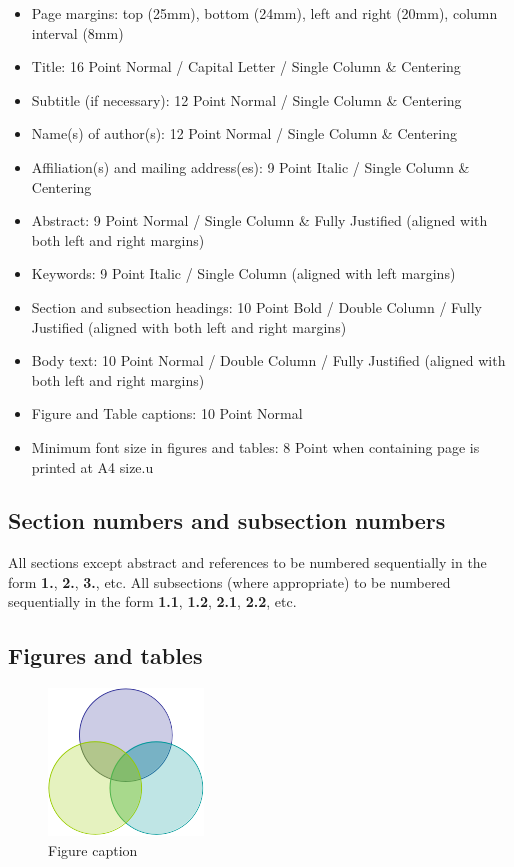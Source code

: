 \documentclass[a4paper,10pt,conference,compsoc]{ISASE}
\begin{document}
\begin{itemize}[noitemsep]
    \item Page margins: top (25mm), bottom (24mm), left and right (20mm),
        column interval (8mm)
    \item Title: 16 Point Normal / Capital Letter / Single Column \& Centering
    \item Subtitle (if necessary): 12 Point Normal / Single Column \& Centering
    \item Name(s) of author(s): 12 Point Normal / Single Column \& Centering
    \item Affiliation(s) and mailing address(es): 9 Point Italic / Single
        Column \& Centering
    \item Abstract: 9 Point Normal / Single Column \& Fully Justified (aligned
        with both left and right margins)
    \item Keywords: 9 Point Italic / Single Column (aligned with left margins)
    \item Section and subsection headings: 10 Point Bold / Double Column /
        Fully Justified (aligned with both left and right margins)
    \item Body text: 10 Point Normal / Double Column / Fully Justified (aligned
        with both left and right margins)
    \item Figure and Table captions: 10 Point Normal
    \item Minimum font size in figures and tables: 8 Point when containing page
        is printed at A4 size.u
\end{itemize}

\subsection{Section numbers and subsection numbers}

All sections except abstract and references to be numbered sequentially in the
form \textbf{1.}, \textbf{2.}, \textbf{3.}, etc. All subsections (where
appropriate) to be numbered sequentially in the form \textbf{1.1},
\textbf{1.2}, \textbf{2.1}, \textbf{2.2}, etc.

\subsection{Figures and tables}

\begin{figure}[b!]
    \centering
    \includegraphics[]{kansei.png}
    \caption[]{Figure caption}
    \label{fig:1}
\end{figure}
\end{document}
